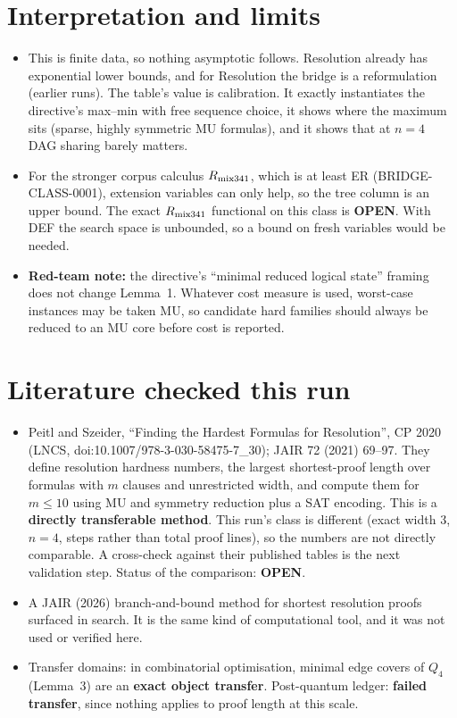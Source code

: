 \documentclass[11pt]{article}
\begin{document}
\section{Interpretation and limits}
\begin{itemize}
\item This is finite data, so nothing asymptotic follows. Resolution already has exponential lower bounds, and for Resolution the bridge is a reformulation (earlier runs). The table's value is calibration. It exactly instantiates the directive's max--min with free sequence choice, it shows where the maximum sits (sparse, highly symmetric MU formulas), and it shows that at $n=4$ DAG sharing barely matters.
\item For the stronger corpus calculus $R_{\rm mix341}$, which is at least ER (BRIDGE-CLASS-0001), extension variables can only help, so the tree column is an upper bound. The exact $R_{\rm mix341}$ functional on this class is \textbf{OPEN}. With DEF the search space is unbounded, so a bound on fresh variables would be needed.
\item \textbf{Red-team note:} the directive's ``minimal reduced logical state'' framing does not change Lemma~1. Whatever cost measure is used, worst-case instances may be taken MU, so candidate hard families should always be reduced to an MU core before cost is reported.
\end{itemize}

\section{Literature checked this run}
\begin{itemize}
\item Peitl and Szeider, ``Finding the Hardest Formulas for Resolution'', CP 2020 (LNCS, doi:10.1007/978-3-030-58475-7\_30); JAIR 72 (2021) 69--97. They define resolution hardness numbers, the largest shortest-proof length over formulas with $m$ clauses and unrestricted width, and compute them for $m\le10$ using MU and symmetry reduction plus a SAT encoding. This is a \textbf{directly transferable method}. This run's class is different (exact width 3, $n=4$, steps rather than total proof lines), so the numbers are not directly comparable. A cross-check against their published tables is the next validation step. Status of the comparison: \textbf{OPEN}.
\item A JAIR (2026) branch-and-bound method for shortest resolution proofs surfaced in search. It is the same kind of computational tool, and it was not used or verified here.
\item Transfer domains: in combinatorial optimisation, minimal edge covers of $Q_4$ (Lemma~3) are an \textbf{exact object transfer}. Post-quantum ledger: \textbf{failed transfer}, since nothing applies to proof length at this scale.
\end{itemize}
\end{document}
